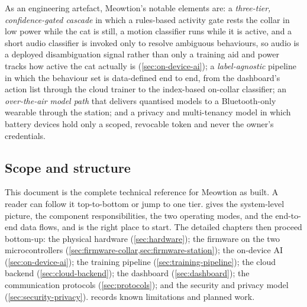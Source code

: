 As an engineering artefact, Meowtion's notable elements are: a \emph{three-tier, confidence-gated
cascade} in which a rules-based activity gate rests the collar in low power while the cat is still, a
motion classifier runs while it is active, and a short audio classifier is invoked only to resolve
ambiguous behaviours, so audio is a deployed disambiguation signal rather than only a training aid
and power tracks how active the cat actually is (\cref{sec:on-device-ai}); a \emph{label-agnostic} pipeline in which the behaviour set
is data-defined end to end, from the dashboard's action list through the cloud trainer to the
index-based on-collar classifier; an \emph{over-the-air model path} that delivers quantised models to
a Bluetooth-only wearable through the station; and a privacy and multi-tenancy model in which battery
devices hold only a scoped, revocable token and never the owner's credentials.

\subsection{Scope and structure}

This document is the complete technical reference for Meowtion as built. A reader can follow it
top-to-bottom or jump to one tier.  gives the system-level picture, the
component responsibilities, the two operating modes, and the end-to-end data flows, and is the right
place to start. The detailed chapters then proceed bottom-up: the physical hardware
(\cref{sec:hardware}); the firmware on the two microcontrollers
(\cref{sec:firmware-collar,sec:firmware-station}); the on-device AI (\cref{sec:on-device-ai}); the
training pipeline (\cref{sec:training-pipeline}); the cloud backend (\cref{sec:cloud-backend}); the
dashboard (\cref{sec:dashboard}); the communication protocols (\cref{sec:protocols}); and the
security and privacy model (\cref{sec:security-privacy}).  records known
limitations and planned work.
